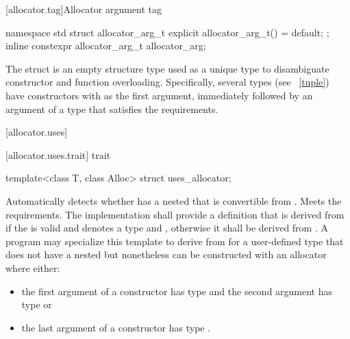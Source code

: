 [allocator.tag]{Allocator argument tag}

%
%
\begin{itemdecl}
namespace std {
  struct allocator_arg_t { explicit allocator_arg_t() = default; };
  inline constexpr allocator_arg_t allocator_arg{};
}
\end{itemdecl}

\pnum
The  struct is an empty structure type used as a unique type to
disambiguate constructor and function overloading. Specifically, several types (see
~\ref{tuple}) have constructors with  as the first
argument, immediately followed by an argument of a type that satisfies the
 requirements.

[allocator.uses]{}

[allocator.uses.trait]{ trait}

%
\begin{itemdecl}
template<class T, class Alloc> struct uses_allocator;
\end{itemdecl}

\begin{itemdescr}
\pnum
\remarks Automatically detects whether  has a nested  that
is convertible from . Meets the 
requirements. The implementation shall provide a definition that is
derived from  if the  
is valid and denotes a type and
, otherwise it shall be
derived from . A program may specialize this template to derive from
 for a user-defined type  that does not have a nested
 but nonetheless can be constructed with an allocator where
either:

\begin{itemize}
\item the first argument of a constructor has type  and the
second argument has type  or

\item the last argument of a constructor has type .
\end{itemize}
\end{itemdescr}

